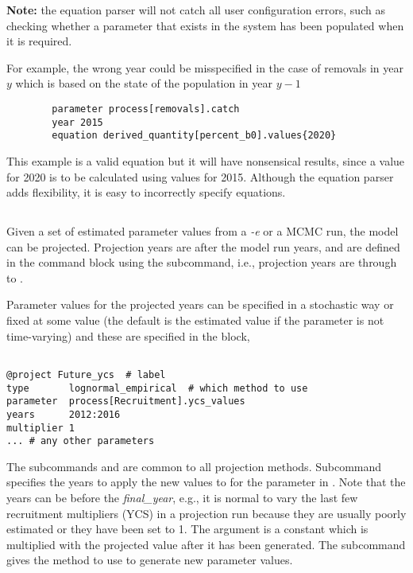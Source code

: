 \textbf{Note:} the equation parser will not catch all user configuration errors, such as checking whether a parameter that exists in the system has been populated when it is required.

For example, the wrong year could be misspecified in the case of removals in year $y$ which is based on the state of the population in year $y-1$

{\small{\begin{verbatim}
		parameter process[removals].catch
		year 2015
		equation derived_quantity[percent_b0].values{2020}
\end{verbatim}}}

This example is a valid equation but it will have nonsensical results, since a value for 2020 is to be calculated using values for 2015. Although the equation parser adds flexibility, it is easy to incorrectly specify equations.

\subsection{}\label{sec:Project} 

Given a set of estimated parameter values from a \textit{-e} or a MCMC run,
the model can be projected. Projection years are after the model run years, and are defined in the  command block using the  subcommand, i.e., projection years are  through to .

Parameter values for the projected years can be specified in a stochastic way or fixed at some value (the default is the estimated value if the parameter is not time-varying) and these are specified in the  block,

{\small{\begin{verbatim}

@project Future_ycs  # label
type       lognormal_empirical  # which method to use
parameter  process[Recruitment].ycs_values
years      2012:2016
multiplier 1
... # any other parameters
\end{verbatim}}}

The subcommands  and  are common to all projection methods. Subcommand  specifies the years to apply the new values to for the parameter in . Note that the years can be before the \textit{final\_year}, e.g., it is normal to vary the last few recruitment multipliers (YCS) in a projection run because they are usually poorly estimated or they have been set to 1.  The argument  is a constant which is multiplied with the projected value after it has been generated. The  subcommand gives the method to use to generate new parameter values.

